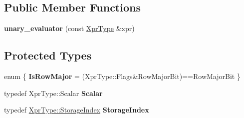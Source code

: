 \subsection*{Public Member Functions}
\begin{DoxyCompactItemize}
\item 
\mbox{\label{struct_eigen_1_1internal_1_1unary__evaluator_3_01_sparse_view_3_01_arg_type_01_4_00_01_index_based_01_4_ae52789aef6d9077a9c762b0f081a1df0}} 
{\bfseries unary\+\_\+evaluator} (const \mbox{\hyperlink{class_eigen_1_1_sparse_view}{Xpr\+Type}} \&xpr)
\end{DoxyCompactItemize}
\subsection*{Protected Types}
\begin{DoxyCompactItemize}
\item 
\mbox{\label{struct_eigen_1_1internal_1_1unary__evaluator_3_01_sparse_view_3_01_arg_type_01_4_00_01_index_based_01_4_a4ab00a50529b08006857c31ecba1c0b7}} 
enum \{ {\bfseries Is\+Row\+Major} = (Xpr\+Type\+::Flags\&Row\+Major\+Bit)==Row\+Major\+Bit
 \}
\item 
\mbox{\label{struct_eigen_1_1internal_1_1unary__evaluator_3_01_sparse_view_3_01_arg_type_01_4_00_01_index_based_01_4_a70ca59fe3ade9597dfcb6b807360a248}} 
typedef Xpr\+Type\+::\+Scalar {\bfseries Scalar}
\item 
\mbox{\label{struct_eigen_1_1internal_1_1unary__evaluator_3_01_sparse_view_3_01_arg_type_01_4_00_01_index_based_01_4_a1a17730ea26d47a55e053c369b875e17}} 
typedef \mbox{\hyperlink{class_eigen_1_1_sparse_matrix_base_a0b540ba724726ebe953f8c0df06081ed}{Xpr\+Type\+::\+Storage\+Index}} {\bfseries Storage\+Index}
\end{DoxyCompactItemize}
